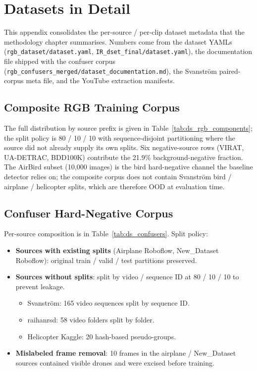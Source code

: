\documentclass[12pt,a4paper,oneside,openright]{book}
\begin{document}
\chapter{Datasets in Detail}
\label{app:datasets}

This appendix consolidates the per-source / per-clip dataset metadata that the methodology chapter summarises. Numbers come from the dataset YAMLs (\texttt{rgb\_dataset/dataset.yaml}, \texttt{IR\_dset\_final/dataset.yaml}), the documentation file shipped with the confuser corpus (\texttt{rgb\_confusers\_merged/dataset\_documentation.md}), the Svanstr\"om paired-corpus meta file, and the YouTube extraction manifests.

\section{Composite RGB Training Corpus}

The full distribution by source prefix is given in Table~\ref{tab:ds_rgb_components}; the split policy is 80 / 10 / 10 with sequence-disjoint partitioning where the source did not already supply its own splits. Six negative-source rows (VIRAT, UA-DETRAC, BDD100K) contribute the 21.9\% background-negative fraction. The AirBird subset (10{,}000 images) is the bird hard-negative channel the baseline detector relies on; the composite corpus does not contain Svanstr\"om bird / airplane / helicopter splits, which are therefore OOD at evaluation time.

\section{Confuser Hard-Negative Corpus}

Per-source composition is in Table~\ref{tab:ds_confusers}. Split policy:

\begin{itemize}
    \item \textbf{Sources with existing splits} (Airplane Roboflow, New\_Dataset Roboflow): original train / valid / test partitions preserved.
    \item \textbf{Sources without splits}: split by video / sequence ID at 80 / 10 / 10 to prevent leakage.
    \begin{itemize}
        \item Svanstr\"om: 165 video sequences split by sequence ID.
        \item raihanrsd: 58 video folders split by folder.
        \item Helicopter Kaggle: 20 hash-based pseudo-groups.
    \end{itemize}
    \item \textbf{Mislabeled frame removal}: 10 frames in the airplane / New\_Dataset sources contained visible drones and were excised before training.
\end{itemize}
\end{document}
